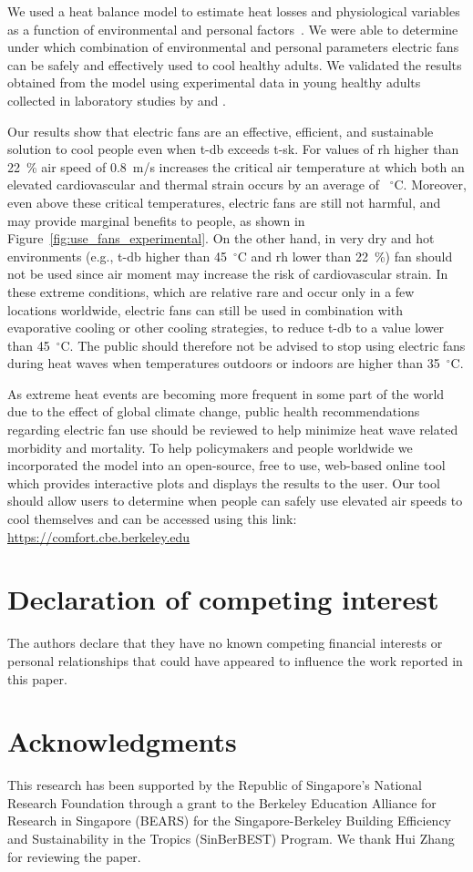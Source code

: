 We used a heat balance model to estimate heat losses and physiological variables as a function of environmental and personal factors~\cite{Gagge1986}.
We were able to determine under which combination of environmental and personal parameters electric fans can be safely and effectively used to cool healthy adults.
We validated the results obtained from the  model using experimental data in young healthy adults collected in laboratory studies by  and .

Our results show that electric fans are an effective, efficient, and sustainable solution to cool people even when \ac{t-db} exceeds \ac{t-sk}.
For values of \ac{rh} higher than 22~\% air speed of 0.8~m/s increases the critical air temperature at which both an elevated cardiovascular and thermal strain occurs by an average of ~$^{\circ}$C\@.
Moreover, even above these critical temperatures, electric fans are still not harmful, and may provide marginal benefits to people, as shown in Figure~\ref{fig:use_fans_experimental}.
On the other hand, in very dry and hot environments (e.g., \ac{t-db} higher than 45~$^{\circ}$C and \ac{rh} lower than 22~\%) fan should not be used since air moment may increase the risk of cardiovascular strain.
In these extreme conditions, which are relative rare and occur only in a few locations worldwide, electric fans can still be used in combination with evaporative cooling or other cooling strategies, to reduce \ac{t-db} to a value lower than 45~$^{\circ}$C\@.
The public should therefore not be advised to stop using electric fans during  heat waves when temperatures outdoors or indoors are higher than 35~$^{\circ}$C\@.

As extreme heat events are becoming more frequent in some part of the world due to the effect of global climate change, public health recommendations regarding electric fan use should be reviewed to help minimize heat wave related morbidity and mortality. 
To help policymakers and people worldwide we incorporated the model into an open-source, free to use, web-based online tool which provides interactive plots and displays the results to the user.
Our tool should allow users to determine when people can safely use elevated air speeds to cool themselves and can be accessed using this link: \url{https://comfort.cbe.berkeley.edu}

\section{Declaration of competing interest} 
The authors declare that they have no known competing financial interests or personal relationships that could have appeared to influence the work reported in this paper.

\section{Acknowledgments}
This research has been supported by the Republic of Singapore’s National Research Foundation through a grant to the Berkeley Education Alliance for Research in Singapore (BEARS) for the Singapore-Berkeley Building Efficiency and Sustainability in the Tropics (SinBerBEST) Program.
We thank Hui Zhang for reviewing the paper.